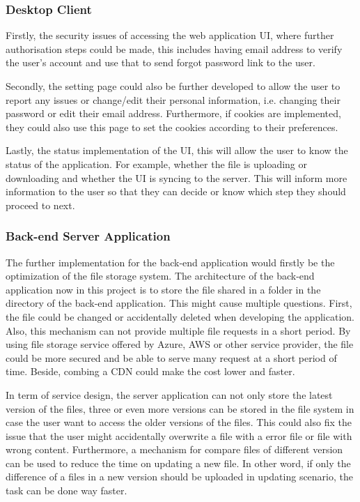 \documentclass{article}
\begin{document}
\subsubsection{Desktop Client}
Firstly, the security issues of accessing the web application UI, where further authorisation steps could be made, this includes having email address to verify the user's account and use that to send forgot password link to the user.

Secondly, the setting page could also be further developed to allow the user to report any issues or change/edit their personal information, i.e. changing their password or edit their email address. Furthermore, if cookies are implemented, they could also use this page to set the cookies according to their preferences.

Lastly, the status implementation of the UI, this will allow the user to know the status of the application. For example, whether the file is uploading or downloading and whether the UI is syncing to the server. This will inform more information to the user so that they can decide or know which step they should proceed to next.

\subsubsection{Back-end Server Application}

The further implementation for the back-end application would firstly be the optimization of the file storage system. The architecture of the back-end application now in this project is to store the file shared in a folder in the directory of the back-end application. This might cause multiple questions. First, the file could be changed or accidentally deleted when developing the application. Also, this mechanism can not provide multiple file requests in a short period. By using file storage service offered by Azure, AWS or other service provider, the file could be more secured and be able to serve many request at a short period of time. Beside, combing a CDN could make the cost lower and faster.

In term of service design, the server application can not only store the latest version of the files, three or even more versions can be stored in the file system in case the user want to access the older versions of the files. This could also fix the issue that the user might accidentally overwrite a file with a error file or file with wrong content. Furthermore, a mechanism for compare files of different version can be used to reduce the time on updating a new file. In other word, if only the difference of a files in a new version should be uploaded in updating scenario, the task can be done way faster.
\end{document}
